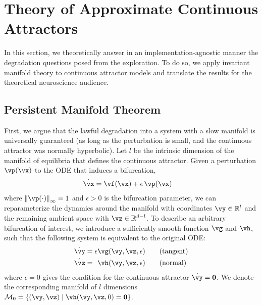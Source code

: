 \documentclass{article} %
\newcounter{ct}
\newcommand{\reals}{\mathbb{R}}
\newcommand{\manifold}{\mathcal{M}}
\newcommand{\uniformNorm}[1]{\left\|#1\right\|_\infty} %
\theoremstyle{definition}
\theoremstyle{remark}
\begin{document}
\section{Theory of Approximate Continuous Attractors}\label{sec:theory}
In this section, we theoretically answer in an implementation-agnostic manner the degradation questions posed from the exploration. 
To do so, we apply invariant manifold theory to continuous attractor models and translate the results for the theoretical neuroscience audience.
\subsection{Persistent Manifold Theorem}\label{sec:imt}
First, we argue that the lawful degradation into a system with a slow manifold is universally guaranteed (as long as the perturbation is small, and the continuous attractor was normally hyperbolic).
Let \(l\) be the intrinsic dimension of the manifold of equilibria that defines the continuous attractor.
Given a perturbation \(\vp(\vx)\) to the ODE that induces a bifurcation,
\begin{align}\label{eq:perturbation:nonparam}
	\dot{\vx} &= \vf(\vx) + \epsilon\,\vp(\vx)
\end{align}
where \(\uniformNorm{\vp(\cdot)} = 1\) and \(\epsilon > 0\) is the bifurcation parameter,
we can reparameterize the dynamics around the manifold with coordinates \(\vy \in \reals^l\) and the remaining ambient space with \(\vz \in \reals^{d-l}\).
To describe an arbitrary bifurcation of interest, we introduce a sufficiently smooth function \(\vg\) and \(\vh\), such that the following system is equivalent to the original ODE:
\begin{align}
    \dot{\vy} &=           \epsilon  \vg(\vy, \vz, \epsilon) \qquad \text{(tangent)}\label{eq:fenichel:flowtangent}\\
    \dot{\vz} &= \hphantom{\epsilon} \vh(\vy, \vz, \epsilon) \qquad \text{(normal)}\label{eq:fenichel:flownormal}
\end{align}
where \(\epsilon = 0\) gives the condition for the continuous attractor \(\dot{\vy} = \mathbf{0}\).
We denote the corresponding manifold of \(l\) dimensions \(\manifold_0 = \{(\vy,\vz) \mid \vh(\vy,\vz,0) = \mathbf{0} \}\).
\end{document}
